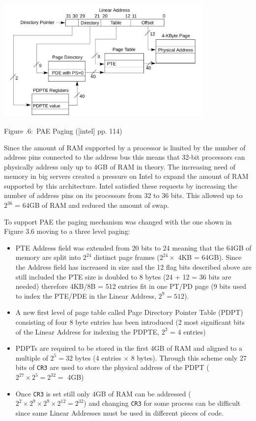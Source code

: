 \documentclass[twoside]{article}
\newcounter{lecnum}
\renewcommand{\cite}[1]{[#1]}
\newcommand{\fig}[3]{
            \vspace{#2}
            \begin{center}
            Figure \thelecnum.#1:~#3
            \end{center}
    }
\begin{document}
\begin{center}
  \includegraphics[width=0.8\textwidth]{pae.png}
  \fig{6}{0 pt}{PAE Paging (\cite{intel} pp. 114) }
\end{center}

Since the amount of RAM  supported by a processor is limited by the number of address pins connected to the address bus this means that 32-bit processors can physically address only up to 4GB of RAM in theory. The increasing need of memory in big servers created a pressure on Intel to expand the amount of RAM supported by this architecture. Intel satisfied these requests by increasing the number of address pins on its processors from 32 to 36 bits. This allowed up to $2^{36}$ = 64GB of RAM and reduced the amount of swap.

To \marginnote{(\cite{bovet_cesati_2006} pp. 52)} support PAE the paging mechanism was changed with the one shown in Figure 3.6 moving to a three level paging:

\begin{itemize}
  \itemsep-3pt
  \item PTE Address field was extended from 20 bits to 24 meaning that the 64GB of memory are split into $2^{24}$ distinct page frames ($2^{24} \times$ 4KB = 64GB). Since the Address field has increased in size and the 12 flag bits described above are still included the PTE size is doubled to 8 bytes (24 + 12 = 36 bits are needed) therefore 4KB/8B = 512 entries fit in one PT/PD page (9 bits used to index the PTE/PDE in the Linear Address, $2^9 = 512$).
  \item A new first level of page table called Page Directory Pointer Table (PDPT) consisting of four 8 byte entries has been introduced (2 most significant bits of the Linear Address for indexing the PDPTE, $2^2$ = 4 entries)
  \item PDPTs are required to be stored in the first 4GB of RAM and aligned to a multiple of $2^5 = 32$ bytes (4 entries $\times$ 8 bytes). Through this scheme only 27 bits of \texttt{CR3} are used to store the physical address of the PDPT ($2^{27} \times 2^5 = 2^{32} = $ 4GB)
  \item Once \texttt{CR3} is set still only 4GB of RAM can be addressed ($2^2 \times 2^9 \times 2^9 \times 2^{12} = 2^{32}$) and changing \texttt{CR3} for some process can be difficult since same Linear Addresses must be used in different pieces of code. 
\end{itemize}
\end{document}
